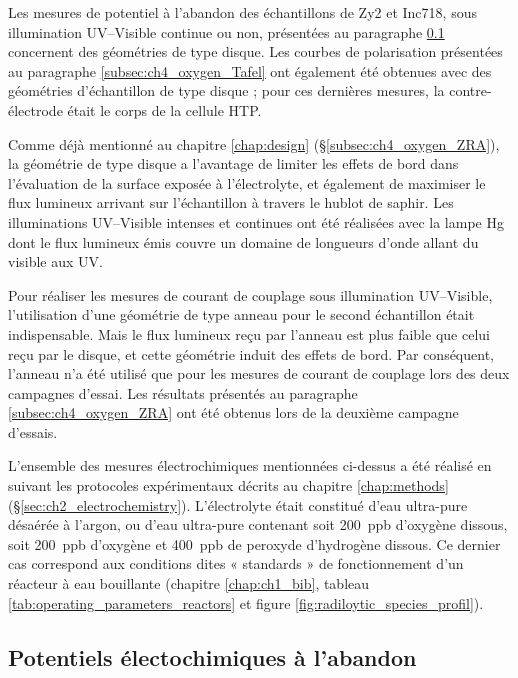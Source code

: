 \begin{refsection}
    Les mesures de potentiel à l’abandon des échantillons de Zy2 et Inc718, sous illumination UV--Visible continue ou
    non, présentées au paragraphe \ref{subsec:ch4_oxygen_ECP} concernent des géométries de type disque. Les courbes de polarisation présentées
    au paragraphe \ref{subsec:ch4_oxygen_Tafel} ont également été obtenues avec des géométries d’échantillon de type disque ; pour ces dernières
    mesures, la contre-électrode était le corps de la cellule HTP.
    
    Comme déjà mentionné au chapitre \ref{chap:design} (\S \ref{subsec:ch4_oxygen_ZRA}), la géométrie 
    de type disque a l’avantage de limiter les
    effets de bord dans l’évaluation de la surface exposée à l’électrolyte, et également de maximiser le flux lumineux
    arrivant sur l’échantillon à travers le hublot de saphir. Les illuminations UV--Visible intenses et continues ont été
    réalisées avec la lampe Hg dont le flux lumineux émis couvre un domaine de longueurs d’onde allant du visible aux
    UV.
    
    Pour réaliser les mesures de courant de couplage sous illumination UV--Visible, l’utilisation d’une géométrie de type
    anneau pour le second échantillon était indispensable. Mais le flux lumineux reçu par l’anneau est plus faible que
    celui reçu par le disque, et cette géométrie induit des effets de bord. Par conséquent, l’anneau n’a été utilisé que
    pour les mesures de courant de couplage lors des deux campagnes d’essai. Les résultats présentés au paragraphe
    \ref{subsec:ch4_oxygen_ZRA}
    ont été obtenus lors de la deuxième campagne d’essais.
    
    L’ensemble des mesures électrochimiques mentionnées ci-dessus a été réalisé en suivant les protocoles expérimentaux
    décrits au chapitre \ref{chap:methods} (\S \ref{sec:ch2_electrochemistry}). L’électrolyte était constitué d’eau ultra-pure désaérée à l’argon, ou d’eau
    ultra-pure contenant soit 200~ppb d’oxygène dissous, soit 200~ppb d’oxygène et 400~ppb de peroxyde d’hydrogène
    dissous. Ce dernier cas correspond aux conditions dites « standards » de fonctionnement d’un réacteur à eau
    bouillante (chapitre \ref{chap:ch1_bib}, tableau \ref{tab:operating_parameters_reactors} et figure \ref{fig:radiloytic_species_profil}). 

    
    
    \subsection{Potentiels électochimiques à l'abandon}\label{subsec:ch4_oxygen_ECP}


\end{refsection}
